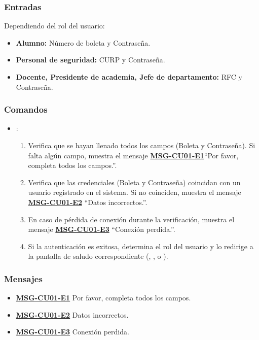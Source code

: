 \subsubsection{Entradas}
Dependiendo del rol del usuario:
\begin{itemize}
	\item \textbf{Alumno:} Número de boleta y Contraseña.
	\item \textbf{Personal de seguridad:} CURP y Contraseña.
	\item \textbf{Docente, Presidente de academia, Jefe de departamento:} RFC y Contraseña.
\end{itemize}
	
	\subsubsection{Comandos}
	\begin{itemize}
		\item {}:
		\begin{enumerate}
			\item Verifica que se hayan llenado todos los campos (Boleta y Contraseña). Si falta algún campo, muestra el mensaje \textbf{\hyperref[msg:CU01-E1]{MSG-CU01-E1}}{``Por favor, completa todos los campos.''}.
			\item Verifica que las credenciales (Boleta y Contraseña) coincidan con un usuario registrado en el sistema. Si no coinciden, muestra el mensaje \textbf{\hyperref[msg:CU01-E2]{MSG-CU01-E2}} ``Datos incorrectos.''.
			\item En caso de pérdida de conexión durante la verificación, muestra el mensaje \textbf{\hyperref[msg:CU01-E3]{MSG-CU01-E3}} ``Conexión perdida.''.
			\item Si la autenticación es exitosa, determina el rol del usuario y lo redirige a la pantalla de saludo correspondiente (, ,  o ).
		\end{enumerate}
		
	\end{itemize}
	
	\subsubsection{Mensajes}
	\begin{itemize}
		\item \textbf{\hyperref[msg:CU01-E1]{MSG-CU01-E1}} Por favor, completa todos los campos.
		\item \textbf{\hyperref[msg:CU01-E2]{MSG-CU01-E2}} Datos incorrectos.
		\item \textbf{\hyperref[msg:CU01-E3]{MSG-CU01-E3}} Conexión perdida.
	\end{itemize}


